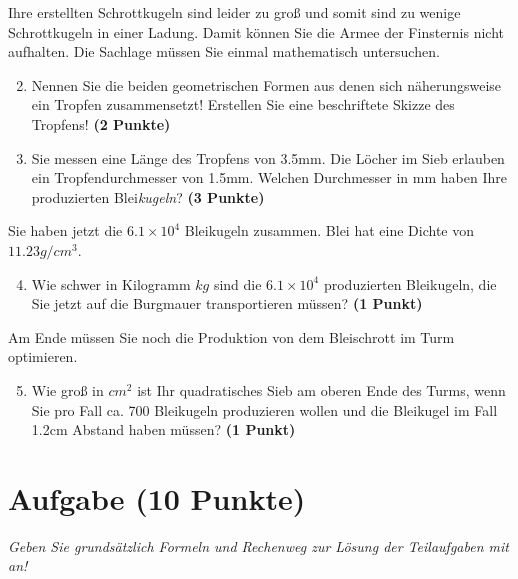 \documentclass[a4paper, 9pt]{scrartcl}\usepackage[]{graphicx}\usepackage[]{xcolor}
\begin{document}
Ihre erstellten Schrottkugeln sind leider zu gro{\ss} und somit sind zu wenige
Schrottkugeln in einer Ladung. Damit k{\"o}nnen Sie die Armee der Finsternis
nicht aufhalten. Die Sachlage m{\"u}ssen Sie einmal mathematisch untersuchen.

\begin{enumerate}
  \setcounter{enumi}{1}
\item Nennen Sie die beiden geometrischen Formen aus denen sich
  n{\"a}herungsweise ein Tropfen zusammensetzt! Erstellen Sie eine beschriftete 
  Skizze des Tropfens!
  \textbf{(2 Punkte)}
\item Sie messen eine L{\"a}nge des Tropfens von 3.5mm. Die L{\"o}cher
  im Sieb erlauben ein Tropfendurchmesser von 1.5mm. Welchen
  Durchmesser in mm haben Ihre produzierten Blei\textit{kugeln}?  \textbf{(3 Punkte)}
\end{enumerate}

Sie haben jetzt die \ensuremath{6.1\times 10^{4}} Bleikugeln zusammen. Blei hat eine Dichte
von $11.23g/cm^3$.

\begin{enumerate}
  \setcounter{enumi}{3}
\item Wie schwer in Kilogramm $kg$ sind die \ensuremath{6.1\times 10^{4}} produzierten
  Bleikugeln, die Sie jetzt auf die Burgmauer transportieren m{\"u}ssen?
  \textbf{(1 Punkt)}
\end{enumerate}

Am Ende m{\"u}ssen Sie noch die Produktion von dem Bleischrott im Turm optimieren.

\begin{enumerate}
  \setcounter{enumi}{4}
\item Wie gro{\ss} in $cm^2$ ist Ihr quadratisches Sieb am oberen Ende des Turms,
  wenn Sie pro Fall ca. 700 Bleikugeln produzieren wollen und
  die Bleikugel im Fall 1.2cm Abstand haben m{\"u}ssen?  \textbf{(1
    Punkt)}
\end{enumerate}
 
\clearpage

\section{Aufgabe \hfill (10 Punkte)}

\textit{Geben Sie grunds{\"a}tzlich Formeln und Rechenweg zur L{\"o}sung der
  Teilaufgaben mit an!} \\[1Ex]
\end{document}
